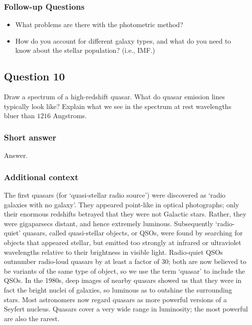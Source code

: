 \documentclass[a4paper,11pt]{article}
\begin{document}
\subsubsection{Follow-up Questions}

\begin{itemize}
    \item What problems are there with the photometric method?
    \item How do you account for different galaxy types, and what do you need to know about the stellar population? (i.e., IMF.)
\end{itemize}



\newpage
\subsection{Question 10}

Draw a spectrum of a high-redshift quasar. What do quasar emission lines typically look like? Explain what we see in the spectrum at rest wavelengths bluer than $1216$ Angstroms.

\subsubsection{Short answer}

Answer.

\subsubsection{Additional context}

{\noindent}The first quasars (for `quasi-stellar radio source') were discovered  as `radio galaxies with no galaxy'. They appeared point-like in optical photographs; only their enormous redshifts betrayed that they were not Galactic stars. Rather, they were gigaparsecs distant, and hence extremely luminous. Subsequently `radio-quiet' quasars, called quasi-stellar objects, or QSOs, were found by searching for objects that appeared stellar, but emitted too strongly at infrared or ultraviolet wavelengths relative to their brightness in visible light. Radio-quiet QSOs outnumber radio-loud quasars by at least a factor of 30; both are now believed to be variants of the same type of object, so we use the term `quasar' to include the QSOs. In the 1980s, deep images of nearby quasars showed us that they were in fact the bright nuclei of galaxies, so luminous as to outshine the surrounding stars. Most astronomers now regard quasars as more powerful versions of a Seyfert nucleus. Quasars cover a very wide range in luminosity; the most powerful are also the rarest.
\end{document}

